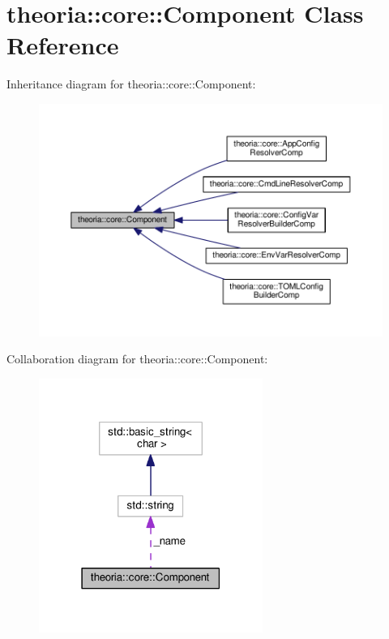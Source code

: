 \hypertarget{classtheoria_1_1core_1_1Component}{}\section{theoria\+:\+:core\+:\+:Component Class Reference}
\label{classtheoria_1_1core_1_1Component}


Inheritance diagram for theoria\+:\+:core\+:\+:Component\+:
\nopagebreak
\begin{figure}[H]
\begin{center}
\leavevmode
\includegraphics[width=350pt]{classtheoria_1_1core_1_1Component__inherit__graph}
\end{center}
\end{figure}


Collaboration diagram for theoria\+:\+:core\+:\+:Component\+:
\nopagebreak
\begin{figure}[H]
\begin{center}
\leavevmode
\includegraphics[width=207pt]{classtheoria_1_1core_1_1Component__coll__graph}
\end{center}
\end{figure}
